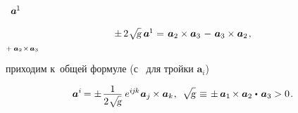 \begin{otherlanguage}{russian}
~${\bm{a}^{\hspace{-0.1ex}1}\hspace{-0.1ex}}$

\nopagebreak\vspace{.8em}\begin{equation*}
\begin{array}{l@{\hspace{.3em}}c@{\hspace{.36em}}r}
\pm \hspace{.33ex} 2 \hspace{.1ex} \scalebox{0.95}[0.96]{$\sqrt{\hspace{-0.36ex}\mathstrut{\textsl{g}}}$} \hspace{.5ex} \bm{a}^{\hspace{-0.1ex}1} & = & \bm{a}_2 \times \bm{a}_3 \hspace{.2ex} \tikzmark{BeginPlusToMinus} - \hspace{.2ex} \bm{a}_3 \times \bm{a}_2 \tikzmark{EndPlusToMinus}
\hspace{.2ex} ,
\end{array}
\end{equation*}%
%
{${\scriptstyle {+ \hspace{.4ex} \bm{a}_2 \hspace{.1ex} \times \hspace{.2ex} \bm{a}_3}}$}

\vspace{-1.3em}\noindent
приходим к~общей формуле (с~\inquotes{$-$} для  тройки ${\bm{a}_i}$)

\nopagebreak\begin{equation}\label{basisvectorstocobasisvectors}
\bm{a}^{i} \hspace{-0.2ex}
= \displaystyle \pm \hspace{.2ex} \frac{\raisemath{-0.4ex}{1}}{2 \hspace{.1ex} \scalebox{0.95}[0.96]{$\sqrt{\hspace{-0.36ex}\mathstrut{\textsl{g}}}$}} \hspace{.5ex} e^{i\hspace{-0.1ex}j\hspace{-0.1ex}k} \hspace{.1ex} \bm{a}_j \hspace{-0.1ex} \times \bm{a}_k \hspace{.1ex},
\:\:
\sqrt{\hspace{-0.36ex}\mathstrut{\textsl{g}}} \hspace{.25ex}
\equiv \hspace{.15ex} \pm \hspace{.4ex} \bm{a}_1 \hspace{-0.2ex} \times \bm{a}_2 \hspace{.1ex} \dotp \hspace{.25ex} \bm{a}_3
> 0
\hspace{.2ex} .
\end{equation}


\end{otherlanguage}
